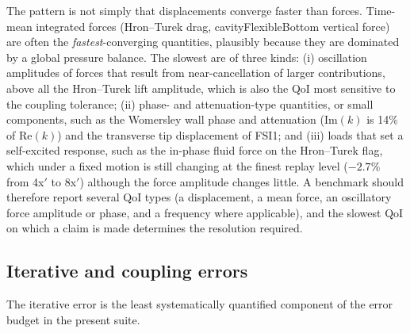 The pattern is not simply that displacements converge faster than forces.
Time-mean integrated forces (Hron--Turek drag, cavityFlexibleBottom vertical force) are often the \emph{fastest}-converging quantities, plausibly because they are dominated by a global pressure balance.
The slowest are of three kinds:
(i) oscillation amplitudes of forces that result from near-cancellation of larger contributions, above all the Hron--Turek lift amplitude, which is also the QoI most sensitive to the coupling tolerance;
(ii) phase- and attenuation-type quantities, or small components, such as the Womersley wall phase and attenuation ($\mathrm{Im}(k)$ is 14\% of $\mathrm{Re}(k)$) and the transverse tip displacement of FSI1; and
(iii) loads that set a self-excited response, such as the in-phase fluid force on the Hron--Turek flag, which under a fixed motion is still changing at the finest replay level ($-2.7\%$ from 4x$'$ to 8x$'$) although the force amplitude changes little.
A benchmark should therefore report several QoI types (a displacement, a mean force, an oscillatory force amplitude or phase, and a frequency where applicable), and the slowest QoI on which a claim is made determines the resolution required.

\subsection{Iterative and coupling errors}\label{sec:iterative_errors}

The iterative error is the least systematically quantified component of the error budget in the present suite.


